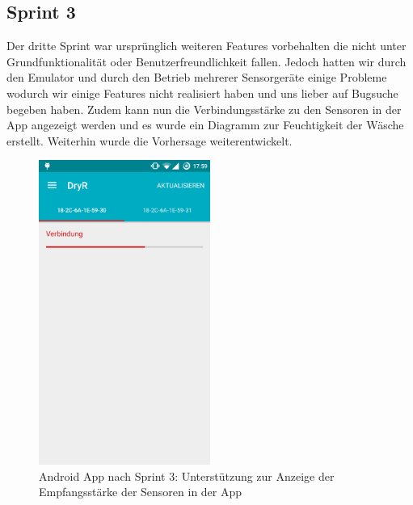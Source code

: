 \subsection{Sprint 3}
		Der dritte Sprint war ursprünglich weiteren Features vorbehalten die nicht unter Grundfunktionalität oder Benutzerfreundlichkeit fallen.
			Jedoch hatten wir durch den Emulator und durch den Betrieb mehrerer Sensorgeräte einige Probleme wodurch wir einige Features nicht realisiert haben und uns lieber auf Bugsuche begeben haben. Zudem kann nun die Verbindungsstärke zu den Sensoren in der App angezeigt werden und es wurde ein Diagramm zur Feuchtigkeit der Wäsche erstellt. Weiterhin wurde die Vorhersage weiterentwickelt.
						\begin{figure}[htb] 
							\centerline{\includegraphics[width=0.5\textwidth]{sensor_status_reception.png}}
							\caption{Android App nach Sprint 3: Unterstützung zur Anzeige der Empfangsstärke der Sensoren in der App}
							\label{screenshot_sprint_3_sensor_status}
						\end{figure}
